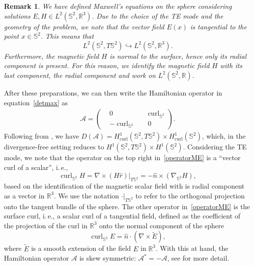 \documentclass[11pt]{amsart}
\newtheorem{remark}[theorem]{Remark}
\newcommand{\R}{{\mathbb R}}
\newcommand{\IS}{\mathbb{S}}
\begin{document}
\begin{remark}
	We have defined Maxwell's equations on the sphere considering solutions $E,H\in L^2(\IS^2,\R^3)$.
	Due to the choice of the TE mode and the geometry of the problem, we note that the vector field $E(x)$ is tangential to the point $x\in\IS^2$. This means that
	$$
	L^2(\IS^2,T\IS^2)\hookrightarrow L^2(\IS^2,\R^3).
	$$
	Furthermore, the magnetic field $H$ is normal to the surface, hence only its radial component is present. For this reason, we identify the magnetic field $H$ with its last component, the radial component and work on $L^2(\IS^2,\R)$.
\end{remark}

After these preparations, we can then write the Hamiltonian operator in equation~\eqref{detmax} as
\begin{align}\label{operatorME}
\mathcal{A}=\left(\begin{matrix}
	&0 \quad &\operatorname{curl}_{\IS^2}\\
	&-\operatorname{curl}_{\IS^2} \quad &0
\end{matrix}\right).
\end{align}
Following from \cite{monk2003finiteElement}, we have $D(\mathcal A)=H^1_{\operatorname{curl}}(\IS^2,T\IS^2)\times H^1_{\operatorname{curl}}(\IS^2)$, which, in the divergence-free setting reduces to $H^1(\IS^2,T\IS^2)\times H^1(\IS^2)$.
Considering the TE mode,
we note that the operator on the top right in~\eqref{operatorME} is a ``vector curl of a scalar'', i.\,e.,
$$
\operatorname{curl}_{\IS^2} H= \nabla\times (H\hat{{r}})|_{T\IS^2}=-\hat{n}\times(\nabla_{\IS^2}H),
$$
based on the identification of the magnetic scalar field with is radial component as a vector in $\R^3$.
We use the notation $\cdot |_{T {\IS^{2}}}$ to refer to the orthogonal projection onto the tangent bundle of the sphere.
The other operator in~\eqref{operatorME} is the surface curl, i.\,e., a scalar curl of a tangential field, defined as the coefficient of the projection of the curl in $\R^3$ onto the
normal component of the sphere
$$
\operatorname{curl}_{\IS^2} E= \hat{n}\cdot(\nabla\times \tilde E),
$$
where $\tilde E$ is a smooth extension of the field $E$ in $\R^3$. 
With this at hand, the Hamiltonian operator $\mathcal{A}$ is skew symmetric:
$\mathcal{A}^*=-\mathcal{A}$, see \cite{monk2003finiteElement} for more detail.
\end{document}

